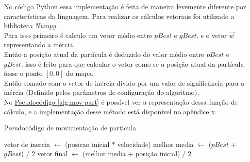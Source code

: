 No código Python essa implementação é feita de maneira levemente diferente por características da linguagem. Para realizar os cálculos vetoriais foi utilizado a biblioteca \textit{Numpy}.\\
\indent Para isso primeiro é calculo um vetor médio entre $pBest$ e $gBest$, e o vetor $\vec w$ representando a inércia.\\
\indent Então a posição atual da partícula é deduzido do valor médio entre $pBest$ e $gBest$, isso é feito para que calcular o vetor como se a posição atual da partícula fosse o ponto $[0,0]$ do mapa.\\
Então somado com o vetor de inércia divido por um valor de significância para a inércia (Definido pelos parâmetros de configuração do algoritmo).\\
%
\indent No \hyperref[alg:mov-part]{Pseudocódigo \ref{alg:mov-part}} é possível ver a representação dessa função de cálculo, e a implementação desse método está disponível no apêndice x.
\begin{algorithm}
    \caption{Pseudocódigo de movimentação de particula}\label{alg:mov-part}
\begin{algorithmic}
\State vetor de inercia $\gets$ (posicao inicial $*$ velocidade)
\State melhor media $\gets$ ($pBest$ + $gBest$) / 2
\State vetor final $\gets$ (melhor media + posição inicial) / 2
\end{algorithmic}
\end{algorithm}

%


%

%


